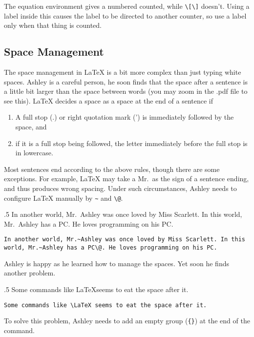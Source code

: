 The equation environment gives a numbered counted, while \verb=\[\]= doesn't. Using a label inside this causes the label to be directed to another counter, so use a label only when that thing is counted.

\subsection{Space Management}
The space management in \LaTeX{} is a bit more complex than just typing white spaces. Ashley is a careful person, he soon finds that the space after a sentence is a little bit larger than the space between words (you may zoom in the .pdf file to see this). \LaTeX{} decides a space as a space at the end of a sentence if
\begin{enumerate}
\item A full stop (.) or right quotation mark (') is immediately followed by the space, and
\item if it is a full stop being followed, the letter immediately before the full stop is in lowercase.
\end{enumerate}
Most sentences end according to the above rules, though there are some exceptions. For example, \LaTeX{} may take a Mr.~as the sign of a sentence ending, and thus produces wrong spacing. Under such circumstances, Ashley needs to configure \LaTeX{} manually by \verb=~= and \verb=\@=.

\begin{parexammar}{.5\textandmarginlen}%
{
In another world, Mr.~Ashley was once loved by Miss Scarlett. In this world, Mr.~Ashley has a PC\@. He loves programming on his PC.
}
\begin{lstlisting}
In another world, Mr.~Ashley was once loved by Miss Scarlett. In this world, Mr.~Ashley has a PC\@. He loves programming on his PC.
\end{lstlisting}
\end{parexammar}
Ashley is happy as he learned how to manage the spaces. Yet soon he finds another problem.

\begin{parexammar}{.5\textandmarginlen}%
{
Some commands like \LaTeX seems to eat the space after it.
}
\begin{lstlisting}
Some commands like \LaTeX seems to eat the space after it.
\end{lstlisting}
\end{parexammar}
To solve this problem, Ashley needs to add an empty group (\verb={}=) at the end of the command.

